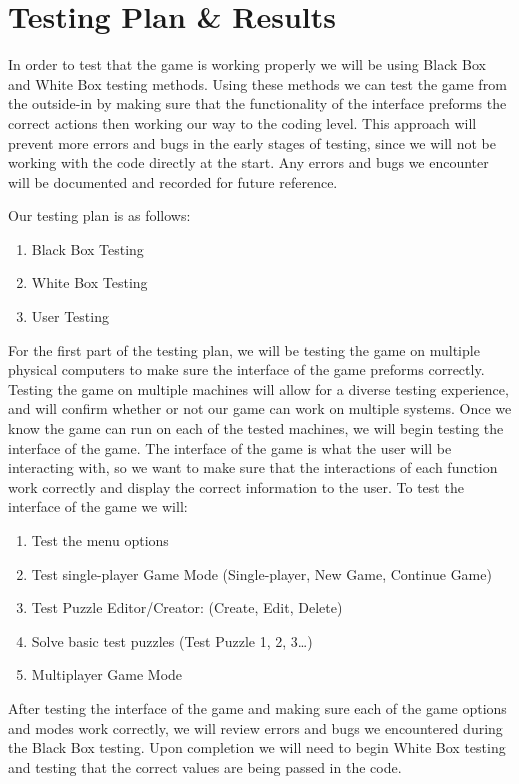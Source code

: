 \documentclass[12pt]{article}
\begin{document}
\section{Testing Plan \& Results}

In order to test that the game is working properly we will be using Black Box and White Box testing methods. Using these methods we can test the game from the outside-in by making sure that the functionality of the interface preforms the correct actions then working our way to the coding level. This approach will prevent more errors and bugs in the early stages of testing, since we will not be working with the code directly at the start. Any errors and bugs we encounter will be documented and recorded for future reference.

Our testing plan is as follows:
\begin{enumerate}
\item Black Box Testing
\item White Box Testing
\item User Testing
\end{enumerate}

For the first part of the testing plan, we will be testing the game on multiple physical computers to make sure the interface of the game preforms correctly. Testing the game on multiple machines will allow for a diverse testing experience, and will confirm whether or not our game can work on multiple systems. Once we know the game can run on each of the tested machines, we will begin testing the interface of the game.
The interface of the game is what the user will be interacting with, so we want to make sure that the interactions of each function work correctly and display the correct information to the user. To test the interface of the game we will:

\begin{enumerate}
\item Test the menu options
\item Test single-player Game Mode (Single-player, New Game, Continue Game)
\item Test Puzzle Editor/Creator: (Create, Edit, Delete)
\item Solve basic test puzzles (Test Puzzle 1, 2, 3\dots)
\item Multiplayer Game Mode
\end{enumerate}

After testing the interface of the game and making sure each of the game options and modes work correctly, we will review errors and bugs we encountered during the Black Box testing. Upon completion we will need to begin White Box testing and testing that the correct values are being passed in the code.
\end{document}
